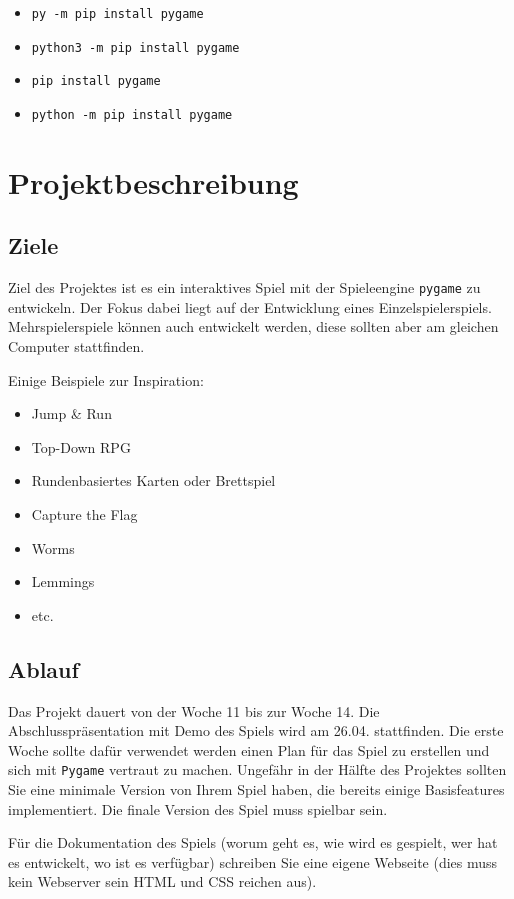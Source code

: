 \documentclass[11pt,a4paper]{report}
\begin{document}
\begin{itemize}
    \item \verb|py -m pip install pygame|
    \item \verb|python3 -m pip install pygame|
    \item \verb|pip install pygame|
    \item \verb|python -m pip install pygame|
\end{itemize}

\newpage

\section{Projektbeschreibung}

\subsection{Ziele} 

Ziel des Projektes ist es ein interaktives Spiel mit der Spieleengine
\verb|pygame| zu entwickeln. Der Fokus dabei liegt auf der Entwicklung eines
Einzelspielerspiels. Mehrspielerspiele können auch entwickelt werden, diese
sollten aber am gleichen Computer stattfinden.

Einige Beispiele zur Inspiration:
\begin{itemize}
\item Jump \& Run
\item Top-Down RPG
\item Rundenbasiertes Karten oder Brettspiel
\item Capture the Flag
\item Worms
\item Lemmings
\item etc.
\end{itemize}

\subsection{Ablauf}
Das Projekt dauert von der Woche 11 bis zur Woche 14. Die Abschlusspräsentation
mit Demo des Spiels wird am 26.04. stattfinden. Die erste Woche sollte dafür
verwendet werden einen Plan für das Spiel zu erstellen und sich mit
\verb|Pygame| vertraut zu machen. Ungefähr in der Hälfte des Projektes sollten
Sie eine minimale Version von Ihrem Spiel haben, die bereits einige
Basisfeatures implementiert. Die finale Version des Spiel muss spielbar sein.

Für die Dokumentation des Spiels (worum geht es, wie wird es gespielt, wer hat
es entwickelt, wo ist es verfügbar) schreiben Sie eine eigene Webseite (dies
muss kein Webserver sein HTML und CSS reichen aus).
\end{document}
